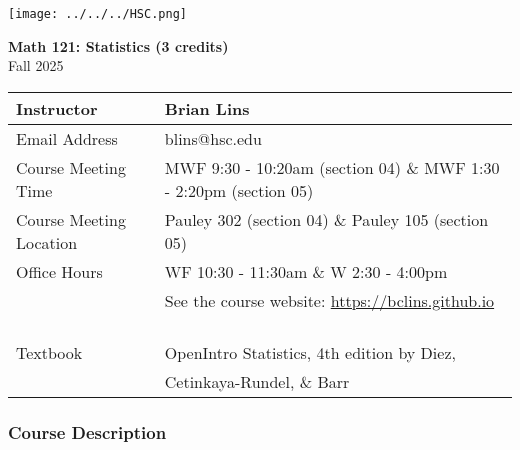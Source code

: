\documentclass[10pt]{article}
\begin{document}
\noindent
%


\begin{center}
\texttt{[image: ../../../HSC.png]} 
\bigskip

\textbf{Math 121: Statistics (3 credits)} \\
Fall 2025
\end{center}

\noindent
\begin{tabular}{|l|l|}
\hline
Instructor & Brian Lins \\ \hline
Email Address & blins@hsc.edu \\ \hline
Course Meeting Time & MWF 9:30 - 10:20am (section 04) \& MWF 1:30 - 2:20pm (section 05) \\ \hline
Course Meeting Location & Pauley 302 (section 04) \& Pauley 105 (section 05)  \\ \hline
Office Hours & WF 10:30 - 11:30am \& W 2:30 - 4:00pm \\ 
& See the course website: \url{https://bclins.github.io} ~ \\ \hline
Textbook & OpenIntro Statistics, 4th edition by Diez,\\ &  Cetinkaya-Rundel, \& Barr \\ \hline
\end{tabular}

\subsubsection*{Course Description}
\end{document}
